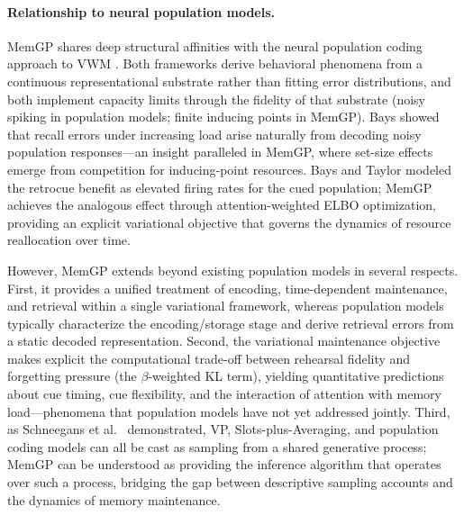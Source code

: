 \documentclass[11pt,letterpaper]{article}
\begin{document}
\paragraph{Relationship to neural population models.}
MemGP shares deep structural affinities with the neural population coding approach to VWM \cite{baysNoiseNeuralPopulations2014a, schneegansNeuralArchitectureFeature2017c, baysNeuralModelRetrospective2018a}. Both frameworks derive behavioral phenomena from a continuous representational substrate rather than fitting error distributions, and both implement capacity limits through the fidelity of that substrate (noisy spiking in population models; finite inducing points in MemGP). Bays \cite{baysNoiseNeuralPopulations2014a} showed that recall errors under increasing load arise naturally from decoding noisy population responses---an insight paralleled in MemGP, where set-size effects emerge from competition for inducing-point resources. Bays and Taylor \cite{baysNeuralModelRetrospective2018a} modeled the retrocue benefit as elevated firing rates for the cued population; MemGP achieves the analogous effect through attention-weighted ELBO optimization, providing an explicit variational objective that governs the dynamics of resource reallocation over time.

However, MemGP extends beyond existing population models in several respects. First, it provides a unified treatment of encoding, time-dependent maintenance, and retrieval within a single variational framework, whereas population models typically characterize the encoding/storage stage and derive retrieval errors from a static decoded representation. Second, the variational maintenance objective makes explicit the computational trade-off between rehearsal fidelity and forgetting pressure (the $\beta$-weighted KL term), yielding quantitative predictions about cue timing, cue flexibility, and the interaction of attention with memory load---phenomena that population models have not yet addressed jointly. Third, as Schneegans et al.\ \cite{schneegansStochasticSamplingProvides2020} demonstrated, VP, Slots-plus-Averaging, and population coding models can all be cast as sampling from a shared generative process; MemGP can be understood as providing the inference algorithm that operates over such a process, bridging the gap between descriptive sampling accounts and the dynamics of memory maintenance.
\end{document}
